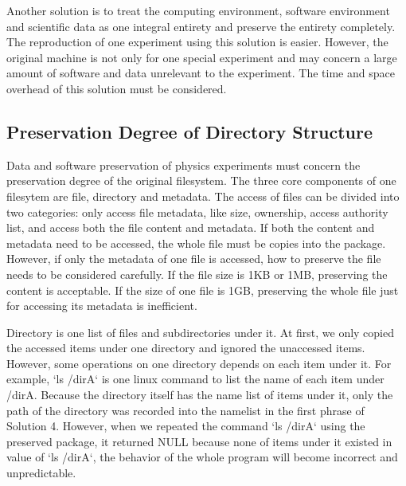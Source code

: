 \documentclass{acm_proc_article-sp}
\begin{document}
Another solution is to treat the computing environment, software environment
and scientific data as one integral entirety and preserve the entirety
completely. The reproduction of one experiment using this solution is easier.
However, the original machine is not only for one special experiment and may
concern a large amount of software and data unrelevant to the experiment. The
time and space overhead of this solution must be considered.

\subsection{Preservation Degree of Directory Structure}

Data and software preservation of physics experiments must concern the
preservation degree of the original filesystem.  The three core components of
one filesytem are file, directory and metadata.  The access of files can be
divided into two categories: only access file metadata, like size, ownership,
access authority list, and access both the file content and metadata.  If both
the content and metadata need to be accessed, the whole file must be copies
into the package.  However, if only the metadata of one file is accessed, how
to preserve the file needs to be considered carefully. If the file size
is 1KB or 1MB, preserving the content is acceptable. If the size of one file is
1GB, preserving the whole file just for accessing its metadata is
inefficient.  

Directory is one list of files and subdirectories under it. At first, we only
copied the accessed items under one directory and ignored the unaccessed items.
However, some operations on one directory depends on each item under it. For
example, `ls /dirA` is one linux command to list the name of each item under
/dirA. Because the directory itself has the name list of items under it, only
the path of the directory was recorded into the namelist in the first phrase of
Solution 4. However, when we repeated the command `ls /dirA` using the preserved package, it returned NULL because none of items under it existed in
value of `ls /dirA`, the behavior of the whole program will become incorrect
and unpredictable. 
\end{document}
